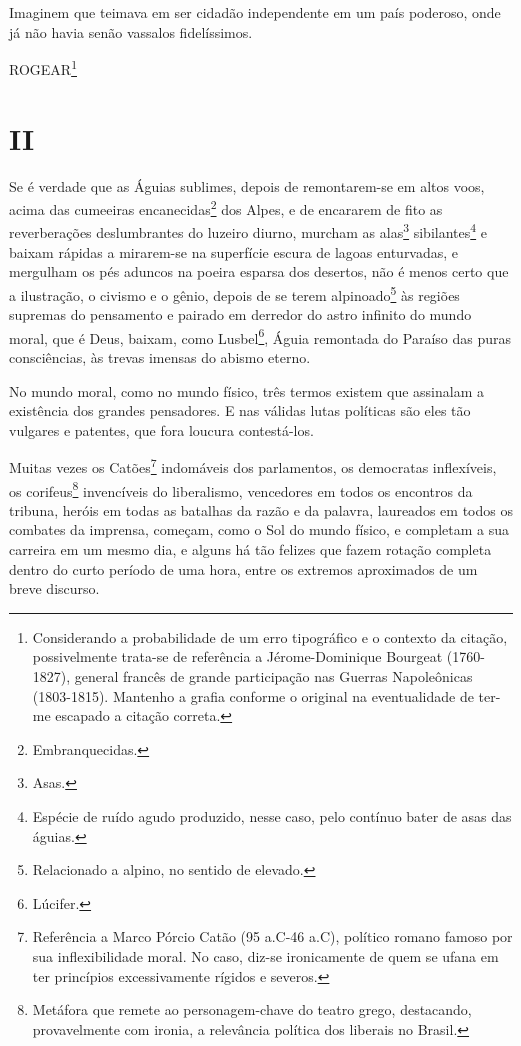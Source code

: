 \asterisc{}

Imaginem que teimava em ser cidadão independente em um país poderoso,
onde já não havia senão vassalos fidelíssimos.

ROGEAR\footnote{Considerando a probabilidade de um erro tipográfico e
  o contexto da citação, possivelmente trata-se de referência a
  Jérome-Dominique Bourgeat (1760-1827), general francês de grande
  participação nas Guerras Napoleônicas (1803-1815). Mantenho a grafia
  conforme o original na eventualidade de ter-me escapado a citação
  correta.}

\section{II}

Se é verdade que as Águias sublimes, depois de remontarem-se em altos
voos, acima das cumeeiras encanecidas\footnote{Embranquecidas.} dos
Alpes, e de encararem de fito as reverberações deslumbrantes do luzeiro
diurno, murcham as alas\footnote{Asas.} sibilantes\footnote{Espécie
  de ruído agudo produzido, nesse caso, pelo contínuo bater de asas das
  águias.} e baixam rápidas a mirarem-se na superfície escura de lagoas
enturvadas, e mergulham os pés aduncos na poeira esparsa dos desertos,
não é menos certo que a ilustração, o civismo e o gênio, depois de se
terem alpinoado\footnote{Relacionado a alpino, no sentido de elevado.}
às regiões supremas do pensamento e pairado em derredor do astro
infinito do mundo moral, que é Deus, baixam, como Lusbel\footnote{Lúcifer.}, 
Águia remontada do Paraíso das puras consciências, às
trevas imensas do abismo eterno.

No mundo moral, como no mundo físico, três termos existem que assinalam
a existência dos grandes pensadores. E nas válidas lutas políticas são
eles tão vulgares e patentes, que fora loucura contestá-los.

Muitas vezes os Catões\footnote{Referência a Marco Pórcio Catão (95
  a.C-46 a.C), político romano famoso por sua inflexibilidade moral. No
  caso, diz-se ironicamente de quem se ufana em ter princípios
  excessivamente rígidos e severos.} indomáveis dos parlamentos, os
democratas inflexíveis, os corifeus\footnote{Metáfora que remete ao
  personagem-chave do teatro grego, destacando, provavelmente com
  ironia, a relevância política dos liberais no Brasil.} invencíveis do
liberalismo, vencedores em todos os encontros da tribuna, heróis em
todas as batalhas da razão e da palavra, laureados em todos os combates
da imprensa, começam, como o Sol do mundo físico, e completam a sua
carreira em um mesmo dia, e alguns há tão felizes que fazem rotação
completa dentro do curto período de uma hora, entre os extremos
aproximados de um breve discurso.


